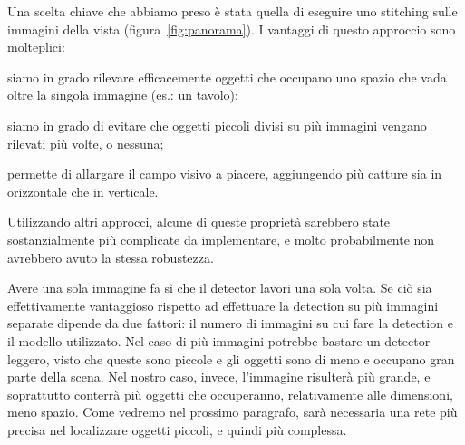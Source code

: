 Una scelta chiave che abbiamo preso è stata quella di eseguire uno stitching sulle immagini della vista (figura~\ref{fig:panorama}). I vantaggi di questo approccio sono molteplici: \begin{enumerate*}[label={(\arabic*)}] \item siamo in grado rilevare efficacemente oggetti che occupano uno spazio che vada oltre la singola immagine (es.\@: un tavolo); \item siamo in grado di evitare che oggetti piccoli divisi su più immagini vengano rilevati più volte, o nessuna; \item permette di allargare il campo visivo a piacere, aggiungendo più catture sia in orizzontale che in verticale.\end{enumerate*} Utilizzando altri approcci, alcune di queste proprietà sarebbero state sostanzialmente più complicate da implementare, e molto probabilmente non avrebbero avuto la stessa robustezza.

Avere una sola immagine fa sì che il detector lavori una sola volta. Se ciò sia effettivamente vantaggioso rispetto ad effettuare la detection su più immagini separate dipende da due fattori: il numero di immagini su cui fare la detection e il modello utilizzato. Nel caso di più immagini potrebbe bastare un detector leggero, visto che queste sono piccole e gli oggetti sono di meno e occupano gran parte della scena. Nel nostro caso, invece, l'immagine risulterà più grande, e soprattutto conterrà più oggetti che occuperanno, relativamente alle dimensioni, meno spazio. Come vedremo nel prossimo paragrafo, sarà necessaria una rete più precisa nel localizzare oggetti piccoli, e quindi più complessa.